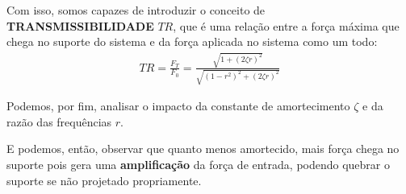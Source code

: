 \documentclass{article}
\begin{document}
            Com isso, somos capazes de introduzir o conceito de \textbf{TRANSMISSIBILIDADE} $TR$, que é uma relação entre a força máxima que chega no suporte do sistema e da força aplicada no sistema
            como um todo:
            \begin{align}
                TR = \frac{F_T}{F_0} = \frac{\sqrt{1 + (2 \zeta r)^2}}{\sqrt{(1 - r^2)^2 + (2 \zeta r)^2}}
            \end{align}

            Podemos, por fim, analisar o impacto da constante de amortecimento $\zeta$ e da razão das frequências $r$.

            E podemos, então, observar que quanto menos amortecido, mais força chega no suporte pois gera uma \textbf{amplificação} da força de entrada, podendo quebrar o suporte se não projetado propriamente.









            
\end{document}
